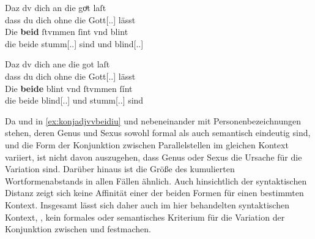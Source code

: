 \begin{exe}
\begin{xlist}
	\ex \label{ex:konjadjvvbeide_4} %
		\begin{taggedline}{\parencites[\pno~30\rb, 60--30\rc, 1]{kc:B1}[zu][10900\psqq]{schroeder1895}}
		\gll Daz dv dich an die goͤt laſt \\
			dass du dich ohne die Gott[\Nom.\Pl.\MascX] lässt \\
	\sn \gll Die \textbf{beid} ſtvmmen ſint vnd blint \\
			die beide stumm[\Nom.\Pl.\MascM] sind und blind[\Nom.\Pl.\MascM] \\
		\end{taggedline}
	
	\ex \label{ex:konjadjvvbeide_5} %
		\gll Daz dv dich ane die got laſt \\
			dass du dich ohne die Gott[\Nom.\Pl.\MascX] lässt \\
	\sn \gll Die \textbf{beide} blint vnd ſtvmmen ſínt \\
			die beide blind[\Nom.\Pl.\MascM] und stumm[\Nom.\Pl.\MascM] sind \\
		\begin{taggedline}{\parencites[\pno~51\va, 29--30]{kc:VB}[zu][10900\psqq]{schroeder1895}}
		\trans {}
		\end{taggedline}
	\end{xlist}
\end{exe}

Da  und  in \cref{ex:konjadjvvbeidiu} und
 nebeneinander mit
Personenbezeichnungen stehen, deren Genus und Sexus sowohl formal als auch
semantisch eindeutig sind, und die Form der Konjunktion zwischen
Parallelstellen im gleichen Kontext variiert, ist nicht davon auszugehen, dass
Genus oder Sexus die Ursache für die Variation sind. Darüber hinaus ist die
Größe des kumulierten Wortformenabstands in allen Fällen ähnlich. Auch
hinsichtlich der syntaktischen Distanz zeigt sich keine Affinität einer der
beiden Formen für einen bestimmten Kontext. Insgesamt lässt sich daher auch im
hier behandelten syntaktischen Kontext, , kein formales oder semantisches Kriterium für die
Variation der Konjunktion zwischen  und  festmachen.


